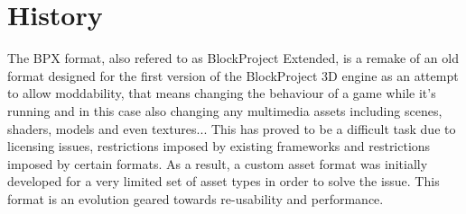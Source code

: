 \section{History}
The BPX format, also refered to as BlockProject Extended, is a remake of an old format designed for the first version of the BlockProject 3D engine as an attempt to allow moddability, that means changing the behaviour of a game while it's running and in this case also changing any multimedia assets including scenes, shaders, models and even textures...\newline
This has proved to be a difficult task due to licensing issues, restrictions imposed by existing frameworks and restrictions imposed by certain formats.\newline
As a result, a custom asset format was initially developed for a very limited set of asset types in order to solve the issue.\newline
This format is an evolution geared towards re-usability and performance.
